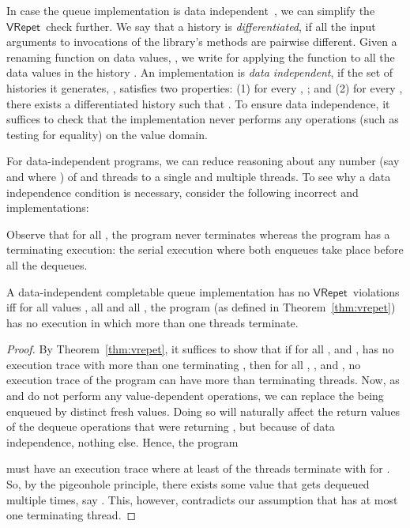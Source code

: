 \documentclass{LMCS}
\newcommand{\VRepet}{\ensuremath{\mathsf{VRepet}}}
\begin{document}
In case the queue implementation is data independent~\cite{WP1986}, we can
simplify the \VRepet\ check further.
We say that a history is \emph{differentiated}, if all the input arguments to invocations
of the library's methods are pairwise different.  Given a renaming function on data
values, , we write  for applying the function
to all the data values in the history .
An implementation is \emph{data independent}, if the set of histories it generates, ,
satisfies two properties: (1) for every , ; and (2) for every ,
there exists a differentiated history  such that .
To ensure data independence, it suffices to check that the implementation
never performs any operations (such as testing for equality) on the value domain.

For data-independent programs, we can reduce reasoning about any number 
(say  and  where ) of  and
 threads to a single  and multiple  threads.
To see why a data independence condition is necessary,
consider the following incorrect  and  implementations:

Observe that for all , the program  never terminates whereas
the program  has a terminating execution: the serial execution where
both enqueues take place before all the dequeues.


\begin{thm}\label{thm:vrepet-di}
A data-independent completable queue implementation has no \VRepet\ violations
iff for all values , all  and all , the program
 (as defined in Theorem~\ref{thm:vrepet})
has no execution in which more than one  threads terminate.
\end{thm}

\begin{proof}
By Theorem~\ref{thm:vrepet}, it suffices to show that if
for all ,  and ,  has no execution trace with more than one
terminating , then
for all , ,  and , no execution trace of the program  can have more
than  terminating  threads.
Now, as  and  do not perform any value-dependent operations, we can
replace the  being enqueued by distinct fresh  values.
Doing so will naturally affect the return values of the dequeue operations that
were returning , but because of data independence, nothing else.
Hence, the program 

must have an execution trace where at least  of the  threads
terminate with  for .
So, by the pigeonhole principle, there exists some value  that gets 
dequeued multiple times, say .  This, however, contradicts our assumption
that  has at most one terminating  thread.
\end{proof}
\end{document}
